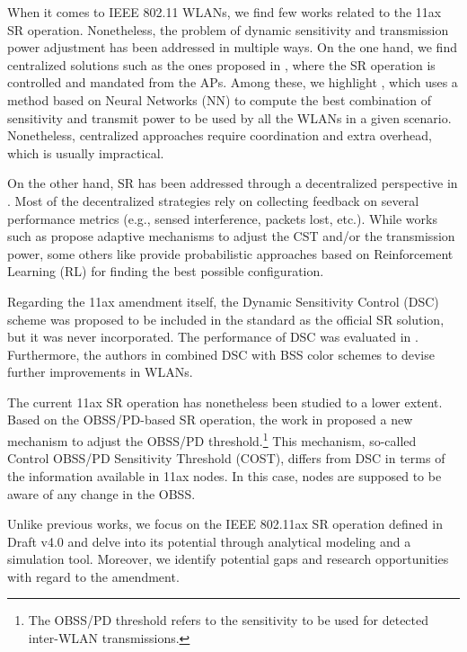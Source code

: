\documentclass[comsoc]{IEEEtran}
\begin{document}
	When it comes to IEEE 802.11 WLANs, we find few works related to the 11ax SR operation. Nonetheless, the problem of dynamic sensitivity and transmission power adjustment has been addressed in multiple ways. On the one hand, we find centralized solutions such as the ones proposed in \cite{li2011achieving, jamil2016novel, nakahira2014centralized}, where the SR operation is controlled and mandated from the APs. Among these, we highlight \cite{jamil2016novel}, which uses a method based on Neural Networks (NN) to compute the best combination of sensitivity and transmit power to be used by all the WLANs in a given scenario. Nonetheless, centralized approaches require coordination and extra overhead, which is usually impractical.
	
	On the other hand, SR has been addressed through a decentralized perspective in \cite{chevillat2005dynamic, tang2011improving, chau2017effective, wilhelmi2019collaborative, wilhelmi2019potential}. Most of the decentralized strategies rely on collecting feedback on several performance metrics (e.g., sensed interference, packets lost, etc.). While works such as \cite{chevillat2005dynamic, tang2011improving, chau2017effective} propose adaptive mechanisms to adjust the CST and/or the transmission power, some others like \cite{wilhelmi2019collaborative, wilhelmi2019potential} provide probabilistic approaches based on Reinforcement Learning (RL) for finding the best possible configuration.
	
	Regarding the 11ax amendment itself, the Dynamic Sensitivity Control (DSC) scheme was proposed to be included in the standard as the official SR solution, but it was never incorporated. The performance of DSC was evaluated in \cite{afaqui2015evaluation, afaqui2016dynamic, kulkarni2015taming}. Furthermore, the authors in \cite{selinis2016evaluation, selinis2017exploiting} combined DSC with BSS color schemes to devise further improvements in WLANs.
	
	The current 11ax SR operation has nonetheless been studied to a lower extent. Based on the OBSS/PD-based SR operation, the work in \cite{selinis2018control} proposed a new mechanism to adjust the OBSS/PD threshold.\footnote{The OBSS/PD threshold refers to the sensitivity to be used for detected inter-WLAN transmissions.} This mechanism, so-called Control OBSS/PD Sensitivity Threshold (COST), differs from DSC in terms of the information available in 11ax nodes. In this case, nodes are supposed to be aware of any change in the OBSS. 
	
	Unlike previous works, we focus on the IEEE 802.11ax SR operation defined in Draft v4.0 and delve into its potential through analytical modeling and a simulation tool. Moreover, we identify potential gaps and research opportunities with regard to the amendment.
\end{document}

